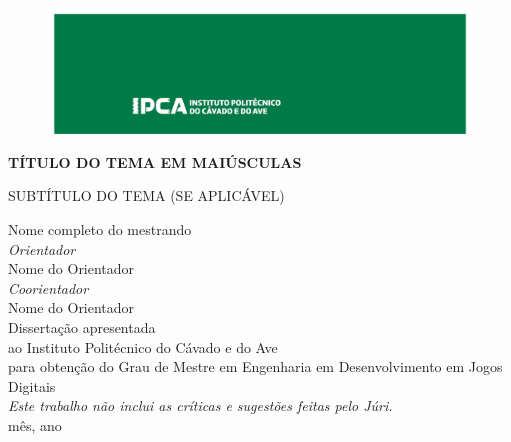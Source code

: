 
\begin{titlepage}
	\clearpage
	\begin{figure}[t!]		
		\vspace*{(-2.54cm -\voffset-\topmargin-\headheight-\headsep)}
		\includegraphics[width=1.00\paperwidth,pagecenter]{Images/FrontCoverLogo.png}
	\end{figure}


	\begin{flushleft}
	\newcommand\nbvspace[1][3]{\vspace*{\stretch{#1}}}
	\newcommand\nbstretchyspace{\spaceskip0.5em plus 0.25em minus 0.25em}
	\newcommand{\nbtitlestretch}{\spaceskip0.6em}
	\pagestyle{empty}

		\bfseries
		\nbvspace[3]		
		{\Large
			TÍTULO DO TEMA EM MAIÚSCULAS}
		
		\mdseries		%
		{\Large SUBTÍTULO DO TEMA (SE APLICÁVEL)}
		
		
		
		\nbvspace[2]
		{\large Nome completo do mestrando } \\[0.6em]
		{\small \emph{ Orientador}} \\[0.2em]
		{\normalsize Nome do Orientador} \\[0.6em]
		{\small \emph{ Coorientador}} \\[0.2em]
		{\normalsize Nome do Orientador}\\[2.0em]
		
		
		
		\small Dissertação apresentada\\
		\small ao Instituto Politécnico do Cávado e do Ave\\
		\small para obtenção do Grau de Mestre em Engenharia em Desenvolvimento em Jogos Digitais \\[2.0em]
		
	    {\small \emph{ Este trabalho não inclui as críticas e sugestões feitas pelo Júri.}} \\[3.0em]
		
		

		{\normalsize mês, ano }
		\nbvspace[1]

\end{flushleft} 
\end{titlepage}